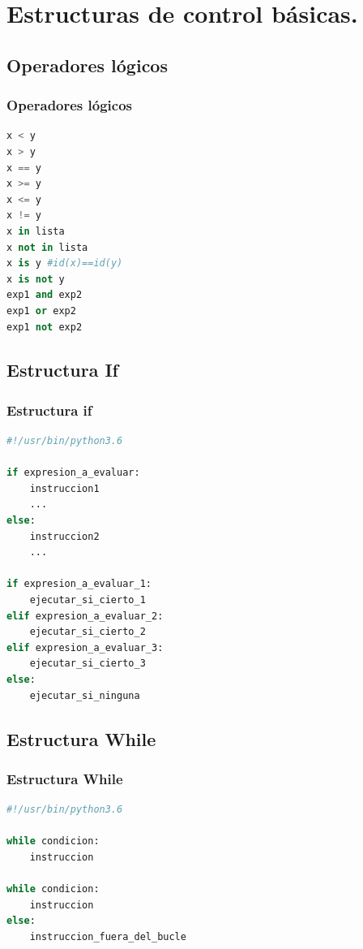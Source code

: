 \documentclass{beamer}
\begin{document}
\section{Estructuras de control básicas.}

\subsection{Operadores lógicos}
\begin{frame}[fragile]
\frametitle{Operadores lógicos}
\begin{lstlisting}[language=Python]
x < y
x > y
x == y
x >= y
x <= y
x != y 
x in lista
x not in lista
x is y #id(x)==id(y)
x is not y
exp1 and exp2
exp1 or exp2
exp1 not exp2
\end{lstlisting}
\end{frame}
\subsection{Estructura If}
\begin{frame}[fragile]
\frametitle{Estructura if}
\begin{lstlisting}[language=Python]
#!/usr/bin/python3.6

if expresion_a_evaluar:
	instruccion1
	...
else:
	instruccion2
	...

if expresion_a_evaluar_1:
	ejecutar_si_cierto_1
elif expresion_a_evaluar_2:
	ejecutar_si_cierto_2
elif expresion_a_evaluar_3:
	ejecutar_si_cierto_3
else:
	ejecutar_si_ninguna

\end{lstlisting}
\end{frame}
\subsection{Estructura While}
\begin{frame}[fragile]
\frametitle{Estructura While}
\begin{lstlisting}[language=Python]
#!/usr/bin/python3.6

while condicion:
	instruccion

while condicion:
	instruccion
else:
	instruccion_fuera_del_bucle

\end{lstlisting}
\end{frame}
\end{document}
